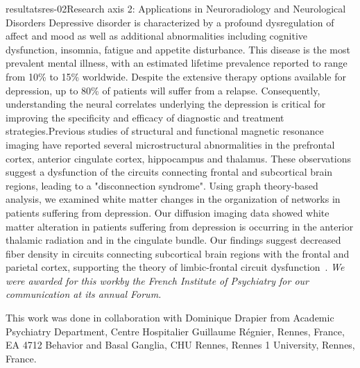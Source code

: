 \documentclass{ra2018}
\begin{document}
\begin{module}{resultats}{res-02}{Research axis 2: Applications in Neuroradiology and Neurological Disorders}
Depressive disorder is characterized by a profound dysregulation of affect and mood as well as additional abnormalities including cognitive dysfunction, insomnia, fatigue and appetite disturbance. This disease is the most prevalent mental illness, with an estimated lifetime prevalence reported to range from 10\% to 15\% worldwide. Despite the extensive therapy options available for depression, up to 80\% of patients will suffer from a relapse. Consequently, understanding the neural correlates underlying the depression is critical for improving the specificity and efficacy of diagnostic and treatment strategies.Previous studies of structural and functional magnetic resonance imaging have reported several microstructural abnormalities in the prefrontal cortex, anterior cingulate cortex, hippocampus and thalamus. These observations suggest a dysfunction of the circuits connecting frontal and subcortical brain regions, leading to a "disconnection syndrome". Using graph theory-based analysis, we examined white matter changes in the organization of networks in patients suffering from depression. Our diffusion imaging data showed white matter alteration in patients suffering from depression is occurring in the anterior thalamic radiation and in the cingulate bundle. Our findings suggest decreased fiber density in circuits connecting subcortical brain regions with the frontal and parietal cortex, supporting the theory of limbic-frontal circuit dysfunction~\cite{coloigner:hal-01890087}. \emph{We were awarded for this workby the French Institute of Psychiatry for our communication at its annual Forum.}

This work was done in collaboration with Dominique Drapier from Academic Psychiatry Department, Centre Hospitalier Guillaume Régnier, Rennes, France, EA 4712 Behavior and Basal Ganglia, CHU Rennes, Rennes 1 University, Rennes, France.

\end{module}
\end{document}
